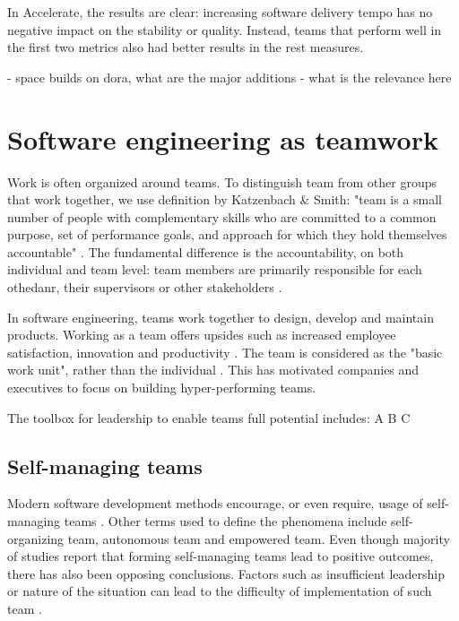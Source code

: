 In Accelerate, the results are clear: increasing software delivery tempo has no negative impact on the stability or quality. Instead, teams that perform well in the first two metrics also had better results in the rest measures. 


- space builds on dora, what are the major additions
- what is the relevance here

\section{Software engineering as teamwork}

Work is often organized around teams. To distinguish team from other groups that work together, we use definition by Katzenbach & Smith: "team is a small number of people with complementary skills who are committed to a common purpose, set of performance goals, and approach for which they hold themselves accountable" \cite{katzenbach_discipline_1993}. The fundamental difference is the accountability, on both individual and team level: team members are primarily responsible for each othedanr, their supervisors or other stakeholders \cite{katzenbach_discipline_1993}.

In software engineering, teams work together to design, develop and maintain products. Working as a team offers upsides such as increased employee satisfaction, innovation and productivity \cite{moe_teamwork_2010}. The team is considered as the "basic work unit", rather than the individual \cite{moe_overcoming_2010}. This has motivated companies and executives to focus on building hyper-performing teams.

The toolbox for leadership to enable teams full potential includes: A B C

\subsection{Self-managing teams}

Modern software development methods encourage, or even require, usage of self-managing teams \cite{moe_teamwork_2010}. Other terms used to define the phenomena include self-organizing team, autonomous team and empowered team. Even though majority of studies report that forming self-managing teams lead to positive outcomes, there has also been opposing conclusions. Factors such as insufficient leadership or nature of the situation can lead to the difficulty of implementation of such team \cite{moe_teamwork_2010}. 

